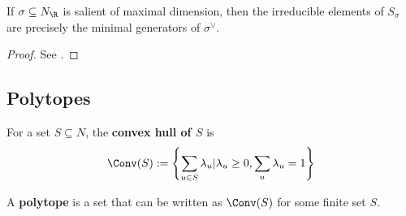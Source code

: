 \begin{proposition}
  \label{02-irred-dual-lat}

  If $\sigma \subseteq N_\R$ is salient of maximal dimension, then the irreducible elements of $S_\sigma$ are precisely the minimal generators of $\sigma^\vee$.
\end{proposition}
\begin{proof}

  See \cite{Cox_2011}.
\end{proof}

\subsection{Polytopes}

\begin{definition}
  \label{3-convex-hull}
  \uses{}
  \leanok
  For a set $S \subseteq N$, the {\bf convex hull of $S$} is
  $$\Conv(S) := \left\{\sum_{u \in S} \lambda_u | \lambda_u \ge 0, \sum_u \lambda_u = 1\right\}$$
\end{definition}

\begin{definition}[Polytope]
  \label{3-polytope}
  \leanok
  A {\bf polytope} is a set that can be written as $\Conv(S)$ for
  some finite set $S$.
\end{definition}
